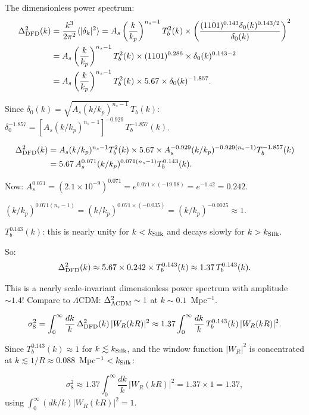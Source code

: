 \documentclass[11pt]{article}
\newcommand{\ee}[1]{\times 10^{#1}}
\newcommand{\LCDM}{$\Lambda$CDM}
\newcommand{\kSilk}{k_{\rm Silk}}
\begin{document}
The dimensionless power spectrum:
\begin{align}
\Delta^2_{\rm DFD}(k) &= \frac{k^3}{2\pi^2}\langle|\delta_k|^2\rangle
= A_s\left(\frac{k}{k_p}\right)^{n_s-1}T_b^2(k)
\times\left(\frac{(1101)^{0.143}\delta_0(k)^{0.143/2}}{\delta_0(k)}\right)^2 \notag\\
&= A_s\left(\frac{k}{k_p}\right)^{n_s-1}T_b^2(k)
\times (1101)^{0.286}\times\delta_0(k)^{0.143-2} \notag\\
&= A_s\left(\frac{k}{k_p}\right)^{n_s-1}T_b^2(k)
\times 5.67\times\delta_0(k)^{-1.857}.
\end{align}

Since $\delta_0(k) = \sqrt{A_s(k/k_p)^{n_s-1}}\,T_b(k)$:
$\delta_0^{-1.857} = [A_s(k/k_p)^{n_s-1}]^{-0.929}\,T_b^{-1.857}(k)$.

\begin{align}
\Delta^2_{\rm DFD}(k) &= A_s(k/k_p)^{n_s-1}T_b^2(k)\times 5.67
\times A_s^{-0.929}(k/k_p)^{-0.929(n_s-1)}T_b^{-1.857}(k) \notag\\
&= 5.67\,A_s^{0.071}(k/k_p)^{0.071(n_s-1)}T_b^{0.143}(k).
\end{align}

Now: $A_s^{0.071} = (2.1\ee{-9})^{0.071} = e^{0.071\times(-19.98)}
= e^{-1.42} = 0.242$.

$(k/k_p)^{0.071(n_s-1)} = (k/k_p)^{0.071\times(-0.035)}
= (k/k_p)^{-0.0025} \approx 1$.

$T_b^{0.143}(k)$: this is nearly unity for $k < \kSilk$ and decays
slowly for $k > \kSilk$.

So:
\begin{equation}
\Delta^2_{\rm DFD}(k) \approx 5.67\times 0.242\times T_b^{0.143}(k)
\approx 1.37\,T_b^{0.143}(k).
\end{equation}

This is a nearly scale-invariant dimensionless power spectrum with
amplitude $\sim 1.4$! Compare to \LCDM: $\Delta^2_{\Lambda\rm CDM}
\sim 1$ at $k \sim 0.1$~Mpc$^{-1}$.

\begin{equation}
\sigma_8^2 = \int_0^\infty \frac{dk}{k}\,\Delta^2_{\rm DFD}(k)
\,|W_R(kR)|^2
\approx 1.37\int_0^\infty \frac{dk}{k}\,T_b^{0.143}(k)\,|W_R(kR)|^2.
\end{equation}

Since $T_b^{0.143}(k) \approx 1$ for $k \lesssim \kSilk$, and the
window function $|W_R|^2$ is concentrated at $k \lesssim 1/R
\approx 0.088$~Mpc$^{-1} < \kSilk$:

\begin{equation}
\sigma_8^2 \approx 1.37\int_0^\infty \frac{dk}{k}\,|W_R(kR)|^2
= 1.37\times 1 = 1.37,
\end{equation}
using $\int_0^\infty (dk/k)|W_R(kR)|^2 = 1$.
\end{document}
